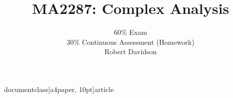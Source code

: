 documentclass[a4paper, 10pt]{article}




\title{
\textbf{MA2287: Complex Analysis} \\ 
}


\author{
  60\% Exam\\
  30\% Continuous Assessment (Homework) \\
  Robert Davidson
}   

 

\date{} %



